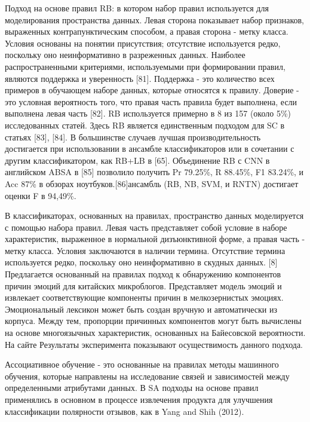 Подход на основе правил RB: в котором набор правил используется для
моделирования пространства данных. Левая сторона показывает набор признаков,
выраженных контрапунктическим способом, а правая сторона - метку класса. Условия
основаны на понятии присутствия; отсутствие используется редко, поскольку оно
неинформативно в разреженных данных. Наиболее распространенными критериями,
используемыми при формировании правил, являются поддержка и уверенность [81].
Поддержка - это количество всех примеров в обучающем наборе данных, которые
относятся к правилу. Доверие - это условная вероятность того, что правая часть
правила будет выполнена, если выполнена левая часть [82]. RB используется
примерно в 8 из 157 (около 5\%) исследованных статей. Здесь RB является
единственным подходом для SC в статьях [83], [84]. В большинстве случаев лучшая
производительность достигается при использовании в ансамбле классификаторов или
в сочетании с другим классификатором, как RB+LB в [65]. Объединение RB с CNN в
английском ABSA в [85] позволило получить Pr 79.25\%, R 88.45\%, F1 83.24\%, и
Acc 87\% в обзорах ноутбуков.[86]ансамбль (RB, NB, SVM, и RNTN) достигает оценки
F в 94,49\%. \cite{article2}

В классификаторах, основанных на правилах, пространство данных моделируется с
помощью набора правил. Левая часть представляет собой условие в наборе
характеристик, выраженное в нормальной дизъюнктивной форме, а правая часть -
метку класса. Условия заключаются в наличии термина. Отсутствие термина
используется редко, поскольку оно неинформативно в скудных данных. [8]
Предлагается основанный на правилах подход к обнаружению компонентов причин
эмоций для китайских микроблогов. Представляет модель эмоций и извлекает
соответствующие компоненты причин в мелкозернистых эмоциях. Эмоциональный
лексикон может быть создан вручную и автоматически из корпуса. Между тем,
пропорции причинных компонентов могут быть вычислены на основе многоязычных
характеристик, основанных на Байесовской вероятности. На сайте Результаты
эксперимента показывают осуществимость данного подхода. \cite{article4}

Ассоциативное обучение - это основанные на правилах методы машинного обучения,
которые направлены на исследование связей и зависимостей между определенными
атрибутами данных. В SA подходы на основе правил применялись в основном в
процессе извлечения продукта для улучшения классификации полярности отзывов, как
в Yang and Shih (2012). \cite{article13}

